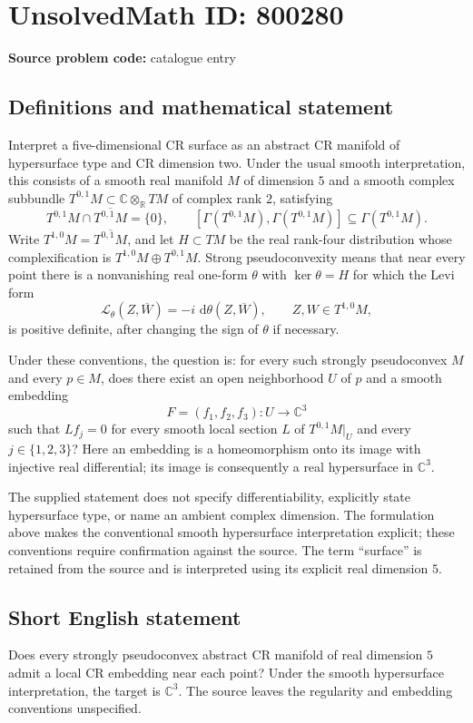 \documentclass[11pt]{article}
\newcommand{\R}{\mathbb{R}}
\newcommand{\C}{\mathbb{C}}
\newcommand{\dd}{\,\mathrm{d}}
\begin{document}
\section*{UnsolvedMath ID: 800280}
\textbf{Source problem code:} catalogue entry
\subsection{Definitions and mathematical statement}
Interpret a five-dimensional CR surface as an abstract CR manifold of hypersurface type and CR dimension two. Under the usual smooth interpretation, this consists of a smooth real manifold \(M\) of dimension \(5\) and a smooth complex subbundle \(T^{0,1}M\subset \C\otimes_{\R}TM\) of complex rank \(2\), satisfying
\[
T^{0,1}M\cap\overline{T^{0,1}M}=\{0\},\qquad
[\Gamma(T^{0,1}M),\Gamma(T^{0,1}M)]\subseteq\Gamma(T^{0,1}M).
\]
Write \(T^{1,0}M=\overline{T^{0,1}M}\), and let \(H\subset TM\) be the real rank-four distribution whose complexification is \(T^{1,0}M\oplus T^{0,1}M\). Strong pseudoconvexity means that near every point there is a nonvanishing real one-form \(\theta\) with \(\ker\theta=H\) for which the Levi form
\[
\mathcal L_{\theta}(Z,\overline W)=-i\,\dd\theta(Z,\overline W),\qquad Z,W\in T^{1,0}M,
\]
is positive definite, after changing the sign of \(\theta\) if necessary.

Under these conventions, the question is: for every such strongly pseudoconvex \(M\) and every \(p\in M\), does there exist an open neighborhood \(U\) of \(p\) and a smooth embedding
\[
F=(f_1,f_2,f_3):U\longrightarrow\C^3
\]
such that \(L f_j=0\) for every smooth local section \(L\) of \(T^{0,1}M|_U\) and every \(j\in\{1,2,3\}\)? Here an embedding is a homeomorphism onto its image with injective real differential; its image is consequently a real hypersurface in \(\C^3\).

The supplied statement does not specify differentiability, explicitly state hypersurface type, or name an ambient complex dimension. The formulation above makes the conventional smooth hypersurface interpretation explicit; these conventions require confirmation against the source. The term ``surface'' is retained from the source and is interpreted using its explicit real dimension \(5\).
\subsection{Short English statement}
Does every strongly pseudoconvex abstract CR manifold of real dimension \(5\) admit a local CR embedding near each point? Under the smooth hypersurface interpretation, the target is \(\C^3\). The source leaves the regularity and embedding conventions unspecified.
\end{document}
